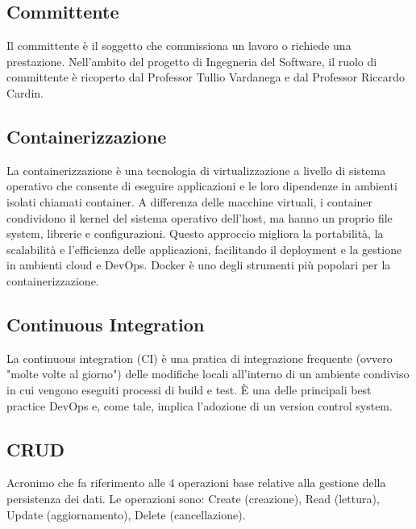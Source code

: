 \vspace{2em}
\subsection*{Committente}
\par Il committente è il soggetto che commissiona un lavoro o richiede una prestazione. Nell’ambito del progetto di Ingegneria del Software, il ruolo di committente è ricoperto dal Professor Tullio Vardanega e dal Professor Riccardo Cardin.

\vspace{2em}
\subsection*{Containerizzazione}
\par La containerizzazione è una tecnologia di virtualizzazione a livello di sistema operativo che consente di eseguire applicazioni e le loro dipendenze in ambienti isolati chiamati container. A differenza delle macchine virtuali, i container condividono il kernel del sistema operativo dell'host, ma hanno un proprio file system, librerie e configurazioni. Questo approccio migliora la portabilità, la scalabilità e l'efficienza delle applicazioni, facilitando il deployment e la gestione in ambienti cloud e DevOps. Docker è uno degli strumenti più popolari per la containerizzazione.

\vspace{2em}
\subsection*{Continuous Integration}
\par La continuous integration (CI) è una pratica di integrazione frequente (ovvero "molte volte al giorno") delle modifiche locali all'interno di un ambiente condiviso in cui vengono eseguiti processi di build e test. È una delle principali best practice DevOps e, come tale, implica l'adozione di un version control system.

\vspace{2em}
\subsection*{CRUD}
\par Acronimo che fa riferimento alle 4 operazioni base relative alla gestione della persistenza dei dati. Le operazioni sono: Create (creazione), Read (lettura), Update (aggiornamento), Delete (cancellazione).

